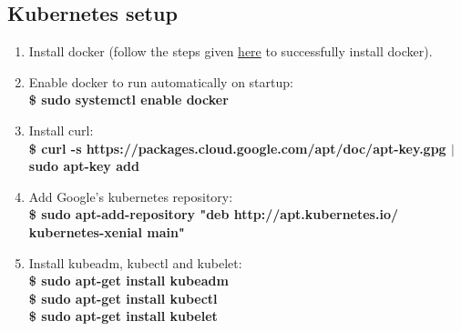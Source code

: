 \documentclass[12pt]{article}
\begin{document}
\subsection{Kubernetes setup}
\begin{enumerate}
	\item Install docker (follow the steps given \hyperref[sec:dockerinstall]{here} to successfully install docker).
	\item Enable docker to run automatically on startup:\\
	\textbf{\$ sudo systemctl enable docker}
	\item Install curl:\\
	\textbf{\$ curl -s https://packages.cloud.google.com/apt/doc/apt-key.gpg $\vert$ sudo apt-key add}
	\item Add Google’s kubernetes repository:\\
	\textbf{\$ sudo apt-add-repository "deb http://apt.kubernetes.io/ kubernetes-xenial main"}
	\item Install kubeadm, kubectl and kubelet:\\
	\textbf{\$ sudo apt-get install kubeadm}\\
	\textbf{\$ sudo apt-get install kubectl}\\
	\textbf{\$ sudo apt-get install kubelet}
\end{enumerate}
\end{document}
